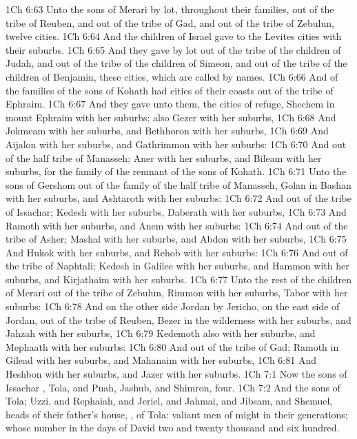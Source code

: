 \vs 1Ch 6:63 Unto the sons of Merari  by lot, throughout their families, out of the tribe of Reuben, and out of the tribe of Gad, and out of the tribe of Zebulun, twelve cities.
\vs 1Ch 6:64 And the children of Israel gave to the Levites  cities with their suburbs.
\vs 1Ch 6:65 And they gave by lot out of the tribe of the children of Judah, and out of the tribe of the children of Simeon, and out of the tribe of the children of Benjamin, these cities, which are called by  names.
\vs 1Ch 6:66 And  of the families of the sons of Kohath had cities of their coasts out of the tribe of Ephraim.
\vs 1Ch 6:67 And they gave unto them,  the cities of refuge, Shechem in mount Ephraim with her suburbs;  also Gezer with her suburbs,
\vs 1Ch 6:68 And Jokmeam with her suburbs, and Bethhoron with her suburbs,
\vs 1Ch 6:69 And Aijalon with her suburbs, and Gathrimmon with her suburbs:
\vs 1Ch 6:70 And out of the half tribe of Manasseh; Aner with her suburbs, and Bileam with her suburbs, for the family of the remnant of the sons of Kohath.
\vs 1Ch 6:71 Unto the sons of Gershom  out of the family of the half tribe of Manasseh, Golan in Bashan with her suburbs, and Ashtaroth with her suburbs:
\vs 1Ch 6:72 And out of the tribe of Issachar; Kedesh with her suburbs, Daberath with her suburbs,
\vs 1Ch 6:73 And Ramoth with her suburbs, and Anem with her suburbs:
\vs 1Ch 6:74 And out of the tribe of Asher; Mashal with her suburbs, and Abdon with her suburbs,
\vs 1Ch 6:75 And Hukok with her suburbs, and Rehob with her suburbs:
\vs 1Ch 6:76 And out of the tribe of Naphtali; Kedesh in Galilee with her suburbs, and Hammon with her suburbs, and Kirjathaim with her suburbs.
\vs 1Ch 6:77 Unto the rest of the children of Merari  out of the tribe of Zebulun, Rimmon with her suburbs, Tabor with her suburbs:
\vs 1Ch 6:78 And on the other side Jordan by Jericho, on the east side of Jordan,  out of the tribe of Reuben, Bezer in the wilderness with her suburbs, and Jahzah with her suburbs,
\vs 1Ch 6:79 Kedemoth also with her suburbs, and Mephaath with her suburbs:
\vs 1Ch 6:80 And out of the tribe of Gad; Ramoth in Gilead with her suburbs, and Mahanaim with her suburbs,
\vs 1Ch 6:81 And Heshbon with her suburbs, and Jazer with her suburbs.
\vs 1Ch 7:1 Now the sons of Issachar , Tola, and Puah, Jashub, and Shimron, four.
\vs 1Ch 7:2 And the sons of Tola; Uzzi, and Rephaiah, and Jeriel, and Jahmai, and Jibsam, and Shemuel, heads of their father's house, , of Tola:  valiant men of might in their generations; whose number  in the days of David two and twenty thousand and six hundred.
